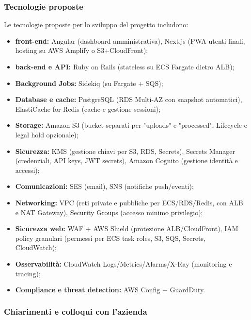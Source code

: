 \documentclass[a4paper,11pt]{article}
\begin{document}
\subsubsection{Tecnologie proposte}
Le tecnologie proposte per lo sviluppo del progetto includono:
\begin{itemize}[noitemsep, topsep=0pt]
 \item \textbf{front-end:} Angular (dashboard amministrativa), Next.js (PWA utenti finali, hosting su AWS Amplify o S3+CloudFront);
 \item \textbf{back-end e API:} Ruby on Rails (stateless su ECS Fargate dietro ALB);
 \item \textbf{Background Jobs:} Sidekiq (su Fargate + SQS);
 \item \textbf{Database e cache:} PostgreSQL (RDS Multi-AZ con snapshot automatici), ElastiCache for Redis (cache e gestione sessioni);
 \item \textbf{Storage:} Amazon S3 (bucket separati per "uploads" e "processed", Lifecycle e legal hold opzionale);
 \item \textbf{Sicurezza:} KMS (gestione chiavi per S3, RDS, Secrets), Secrets Manager (credenziali, API keys, JWT secrets), Amazon Cognito (gestione identità e accessi);
 \item \textbf{Comunicazioni:} SES (email), SNS (notifiche push/eventi);
 \item \textbf{Networking:} VPC (reti private e pubbliche per ECS/RDS/Redis, con ALB e NAT Gateway), Security Groups (accesso minimo privilegio);
 \item \textbf{Sicurezza web:} WAF + AWS Shield (protezione ALB/CloudFront), IAM policy granulari (permessi per ECS task roles, S3, SQS, Secrets, CloudWatch);
 \item \textbf{Osservabilità:} CloudWatch Logs/Metrics/Alarms/X-Ray (monitoring e tracing);
 \item \textbf{Compliance e threat detection:} AWS Config + GuardDuty.
\end{itemize}

\subsubsection{Chiarimenti e colloqui con l'azienda}
\end{document}
